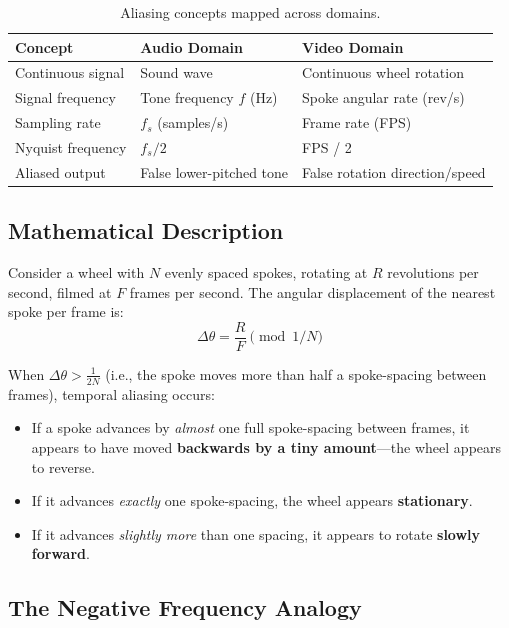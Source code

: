 \documentclass[12pt, a4paper]{article}
\begin{document}
\begin{table}[H]
\centering
\caption{Aliasing concepts mapped across domains.}
\label{tab:domain-map}
\begin{tabular}{@{}lll@{}}
\toprule
\textbf{Concept} & \textbf{Audio Domain} & \textbf{Video Domain} \\
\midrule
Continuous signal   & Sound wave                  & Continuous wheel rotation \\
Signal frequency    & Tone frequency $f$ (Hz)     & Spoke angular rate (rev/s) \\
Sampling rate       & $f_s$ (samples/s)           & Frame rate (FPS) \\
Nyquist frequency   & $f_s / 2$                   & FPS / 2 \\
Aliased output      & False lower-pitched tone    & False rotation direction/speed \\
\bottomrule
\end{tabular}
\end{table}

\subsection{Mathematical Description}

Consider a wheel with $N$ evenly spaced spokes, rotating at $R$ revolutions per second, filmed at $F$ frames per second. The angular displacement of the nearest spoke per frame is:
\begin{equation}
    \Delta\theta = \frac{R}{F} \pmod{1/N}
\end{equation}

When $\Delta\theta > \frac{1}{2N}$ (i.e., the spoke moves more than half a spoke-spacing between frames), temporal aliasing occurs:

\begin{itemize}
    \item If a spoke advances by \emph{almost} one full spoke-spacing between frames, it appears to have moved \textbf{backwards by a tiny amount}---the wheel appears to reverse.
    \item If it advances \emph{exactly} one spoke-spacing, the wheel appears \textbf{stationary}.
    \item If it advances \emph{slightly more} than one spacing, it appears to rotate \textbf{slowly forward}.
\end{itemize}

\subsection{The Negative Frequency Analogy}
\end{document}

